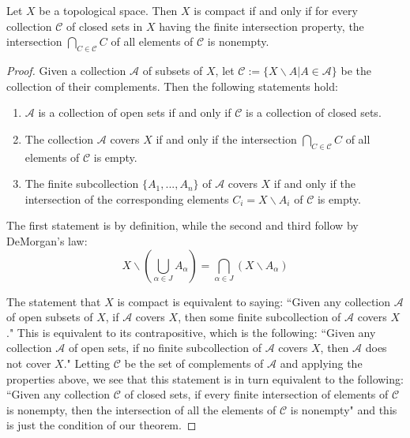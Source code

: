 \documentclass[12pt, a4paper, oneside, openright, titlepage]{book}
\begin{document}
\begin{thm}
    Let $X$ be a topological space. Then $X$ is compact if and only if for every collection $\mathcal{C}$ of closed sets in $X$ having the finite intersection property, the intersection $\bigcap_{C\in\mathcal{C}}C$ of all elements of $\mathcal{C}$ is nonempty.
\end{thm}
\begin{proof}
    Given a collection $\mathcal{A}$ of subsets of $X$, let $\mathcal{C} := \{X\backslash A\vert A \in \mathcal{A}\}$ be the collection of their complements. Then the following statements hold: \begin{enumerate}
        \item $\mathcal{A}$ is a collection of open sets if and only if $\mathcal{C}$ is a collection of closed sets.
        \item The collection $\mathcal{A}$ covers $X$ if and only if the intersection $\bigcap_{C\in\mathcal{C}}C$ of all elements of $\mathcal{C}$ is empty.
        \item The finite subcollection $\{A_1,...,A_n\}$ of $\mathcal{A}$ covers $X$ if and only if the intersection of the corresponding elements $C_i = X\backslash A_i$ of $\mathcal{C}$ is empty.
    \end{enumerate}
    The first statement is by definition, while the second and third follow by DeMorgan's law: \begin{equation*}
        X\backslash\left(\bigcup\limits_{\alpha \in J}A_{\alpha}\right) = \bigcap\limits_{\alpha \in J}(X\backslash A_{\alpha})
    \end{equation*}
    

    The statement that $X$ is compact is equivalent to saying: ``Given any collection $\mathcal{A}$ of open subsets of $X$, if $\mathcal{A}$ covers $X$, then some finite subcollection of $\mathcal{A}$ covers $X$." This is equivalent to its contrapositive, which is the following: ``Given any collection $\mathcal{A}$ of open sets, if no finite subcollection of $\mathcal{A}$ covers $X$, then $\mathcal{A}$ does not cover $X$." Letting $\mathcal{C}$ be the set of complements of $\mathcal{A}$ and applying the properties above, we see that this statement is in turn equivalent to the following: ``Given any collection $\mathcal{C}$ of closed sets, if every finite intersection of elements of $\mathcal{C}$ is nonempty, then the intersection of all the elements of $\mathcal{C}$ is nonempty" and this is just the condition of our theorem.
\end{proof}
\end{document}
